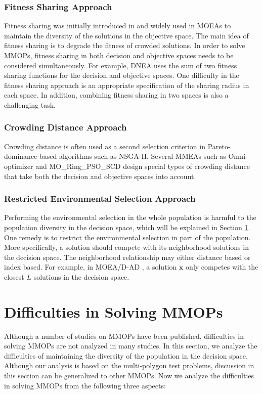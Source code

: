 \documentclass[conference]{IEEEtran}
\begin{document}
\subsubsection{Fitness Sharing Approach}
Fitness sharing was initially introduced in \cite{goldberg1987genetic} and widely used in MOEAs to maintain the diversity of the solutions in the objective space. The main idea of fitness sharing is to degrade the fitness of crowded solutions. In order to solve MMOPs, fitness sharing in both decision and objective spaces needs to be considered simultaneously. For example, DNEA\cite{liu2018double} uses the sum of two fitness sharing functions for the decision and objective spaces. One difficulty in the fitness sharing approach is an appropriate specification of the sharing radius in each space. In addition, combining fitness sharing in two spaces is also a challenging task.
\subsubsection{Crowding Distance Approach}
Crowding distance is often used as a second selection criterion in Pareto-dominance based algorithms such as NSGA-II\cite{deb2002fast}. Several MMEAs such as Omni-optimizer\cite{deb2005omni} and MO\_Ring\_PSO\_SCD\cite{yue2017multiobjective} design special types of crowding distance that take both the decision and objective spaces into account.
\subsubsection{Restricted Environmental Selection Approach}
Performing the environmental selection in the whole population is harmful to the population diversity in the decision space, which will be explained in Section \ref{Difficulties Analysis}. One remedy is to restrict the environmental selection in part of the population. More specifically, a solution should compete with its neighborhood solutions in the decision space. The neighborhood relationship may either distance based or index based. For example, in MOEA/D-AD \cite{tanabe2018decomposition}, a solution $\boldsymbol{x}$ only competes with the closest $L$ solutions in the decision space.

\section{Difficulties in Solving MMOPs}
\label{Difficulties Analysis}
Although a number of studies on MMOPs have been published, difficulties in solving MMOPs are not analyzed in many studies. In this section, we analyze the difficulties of maintaining the diversity of the population in the decision space. Although our analysis is based on the multi-polygon test problems, discussion in this section can be generalized to other MMOPs. Now we analyze the difficulties in solving MMOPs from the following three aspects:
\end{document}
